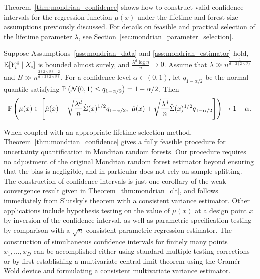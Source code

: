 Theorem~\ref{thm:mondrian_confidence} shows how to construct valid confidence
intervals
for the regression function $\mu(x)$ under the lifetime and forest size
assumptions previously discussed. For details on feasible and practical
selection of the lifetime parameter $\lambda$, see
Section~\ref{sec:mondrian_parameter_selection}.
%
\begin{theorem}%
  \label{thm:mondrian_confidence}
  Suppose Assumptions~\ref{ass:mondrian_data} and \ref{ass:mondrian_estimator}
  hold,
  $\E[Y_i^4 \mid X_i ]$ is bounded almost surely,
  and $\frac{\lambda^d \log n}{n} \to 0$. Assume that
  $\lambda \gg n^{\frac{1}{d + 2(2 \wedge \beta)}}$
  and $B \gg n^{\frac{2 (2 \wedge \beta) - 2}{d + 2 (2 \wedge \beta)}}$.
  For a confidence level $\alpha \in (0, 1)$,
  let $q_{1 - \alpha / 2}$ be the normal quantile satisfying
  $\P \left( \cN(0, 1) \leq q_{1 - \alpha / 2} \right) = 1 - \alpha / 2$. Then
  \begin{align*}
    \P \left(
      \mu(x) \in
      \left[
        \hat \mu(x)
        - \sqrt{\frac{\lambda^d}{n}} \hat \Sigma(x)^{1/2}
        q_{1 - \alpha / 2}, \
        \hat \mu(x)
        + \sqrt{\frac{\lambda^d}{n}} \hat \Sigma(x)^{1/2}
        q_{1 - \alpha / 2}
      \right]
    \right)
    \to
    1 - \alpha.
  \end{align*}

\end{theorem}

When coupled with an appropriate lifetime selection method,
Theorem~\ref{thm:mondrian_confidence} gives a fully feasible procedure for
uncertainty
quantification in Mondrian random forests. Our procedure requires no adjustment
of the original Mondrian random forest estimator beyond ensuring that the bias
is negligible, and in particular does not rely on sample splitting. The
construction of confidence intervals is just one corollary of the weak
convergence result given in Theorem~\ref{thm:mondrian_clt}, and follows
immediately from
Slutsky's theorem with a consistent variance estimator. Other applications
include hypothesis testing on the value of $\mu(x)$ at a design point $x$ by
inversion of the confidence interval, as well as parametric specification
testing by comparison with a $\sqrt{n}$-consistent parametric regression
estimator. The construction of simultaneous confidence intervals for finitely
many points $x_1, \ldots, x_D$ can be accomplished either using standard
multiple testing corrections or by first establishing a multivariate central
limit theorem using the Cram{\'e}r--Wold device
\citep[Chapter~8]{pollard2002user}
and formulating a consistent multivariate variance estimator.

